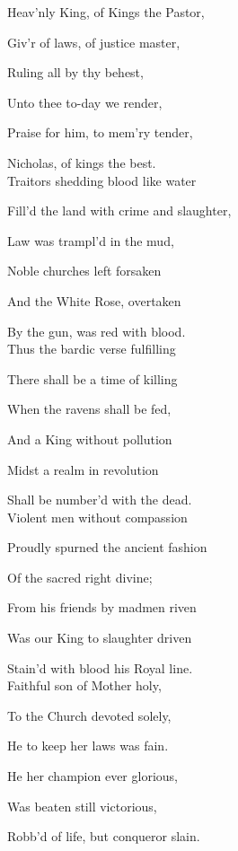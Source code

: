 \begin{multicols}{2}
Heav'nly King, of Kings the Pastor,

Giv'r of laws, of justice master,

Ruling all by thy behest,

Unto thee to-day we render,

Praise for him, to mem'ry tender,

Nicholas, of kings the best.\\

Traitors shedding blood like water

Fill'd the land with crime and slaughter,

Law was trampl'd in the mud,

Noble churches left forsaken

And the White Rose, overtaken

By the gun, was red with blood.\\

Thus the bardic verse fulfilling

There shall be a time of killing

When the ravens shall be fed,

And a King without pollution

Midst a realm in revolution

Shall be number'd with the dead.\\

Violent men without compassion

Proudly spurned the ancient fashion

Of the sacred right divine;

From his friends by madmen riven

Was our King to slaughter driven

Stain'd with blood his Royal line.\\

Faithful son of Mother holy,

To the Church devoted solely,

He to keep her laws was fain.

He her champion ever glorious,

Was beaten still victorious,

Robb'd of life, but conqueror slain.\\




\end{multicols}
